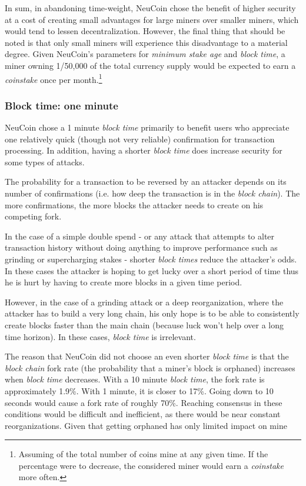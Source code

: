 \documentclass[a4paper,11pt]{article}
\begin{document}
In sum, in abandoning time-weight, NeuCoin chose the benefit of higher security at a cost of creating small advantages for large miners over smaller miners, which would tend to lessen decentralization. However, the final thing that should be noted is that only small miners will experience this disadvantage to a material degree. Given NeuCoin's parameters for \textit{minimum stake age} and \textit{block time}, a miner owning 1/50,000 of the total currency supply would be expected to earn a \textit{coinstake} once per month.\footnote{Assuming  of the total number of coins mine at any given time. If the percentage were to decrease, the considered miner would earn a \textit{coinstake} more often. }


\subsubsection*{Block time: one minute}

NeuCoin chose a 1 minute \textit{block time} primarily to benefit users who appreciate one relatively quick (though not very reliable) confirmation for transaction processing. In addition, having a shorter \textit{block time} does increase security for some types of attacks.

The probability for a transaction to be reversed by an attacker depends on its number of confirmations (i.e. how deep the transaction is in the \textit{block chain}). The more confirmations, the more blocks the attacker needs to create on his competing fork.

In the case of a simple double spend - or any attack that attempts to alter transaction history without doing anything to improve performance such as grinding or supercharging stakes - shorter \textit{block times} reduce the attacker's odds. In these cases the attacker is hoping to get lucky over a short period of time thus he is hurt by having to create more blocks in a given time period.

However, in the case of a grinding attack or a deep reorganization, where the attacker has to build a very long chain, his only hope is to be able to consistently create blocks faster than the main chain (because luck won't help over a long time horizon). In these cases, \textit{block time} is irrelevant.

The reason that NeuCoin did not choose an even shorter \textit{block time} is that the \textit{block chain} fork rate (the probability that a miner's block is orphaned) increases when \textit{block time} decreases. With a 10 minute \textit{block time}, the fork rate is approximately 1.9\%. With 1 minute, it is closer to 17\%. Going down to 10 seconds would cause a fork rate of roughly 70\%\cite{decker2013information}. Reaching consensus in these conditions would be difficult and inefficient, as there would be near constant reorganizations. Given that getting orphaned has only limited impact on mine
\end{document}
